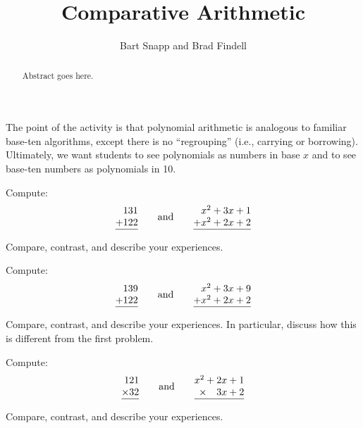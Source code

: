 \documentclass{ximera}
\title{Comparative Arithmetic}
\author{Bart Snapp and Brad Findell}
\begin{document}
\begin{abstract}
Abstract goes here.  
\end{abstract}
\maketitle

\label{A:CA}

\begin{teachingnote}
The point of the activity is that polynomial arithmetic is analogous to familiar base-ten algorithms, except there is no ``regrouping'' (i.e., carrying or borrowing).  Ultimately, we want students to see polynomials as numbers in base $x$ and to see base-ten numbers as polynomials in 10.
\end{teachingnote}

\begin{problem} Compute:
\[
\begin{array}{@{}r@{}}
131\\
+122\\ \hline
\end{array}
\qquad\text{and}
\qquad
\begin{array}{@{}r@{}}
x^2+3x+1\\
+x^2+2x+2\\ \hline
\end{array}
\]

\vspace{0.5in}
Compare, contrast, and describe your experiences.
\end{problem}

\begin{problem} Compute:
\[
\begin{array}{@{}r@{}}
139\\
+122\\ \hline
\end{array}
\qquad\text{and}
\qquad
\begin{array}{@{}r@{}}
x^2+3x+9\\
+x^2+2x+2\\ \hline
\end{array}
\]

\vspace{0.5in}
Compare, contrast, and describe your experiences. In particular,
discuss how this is different from the first problem.
\end{problem}


\begin{problem} Compute:
\[
\begin{array}{@{}r@{}}
121\\
\times 32\\ \hline
\end{array}
\qquad\text{and}
\qquad
\begin{array}{@{}r@{}}
x^2+2x+1\\
\times~~~3x+2\\ \hline
\end{array}
\]
\vspace{0.8in}

Compare, contrast, and describe your experiences.
\end{problem}
\end{document}
